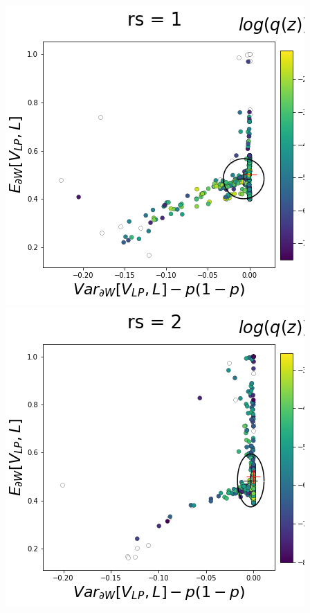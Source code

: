 \documentclass[11pt]{article}
\begin{document}
\begin{center}
\includegraphics[scale=0.33]{figs/T_x_SC_pvar_reduced_c=0_p=50_rs=1.png}
\includegraphics[scale=0.33]{figs/T_x_SC_pvar_reduced_c=0_p=50_rs=2.png}

\end{center}
\end{document}
